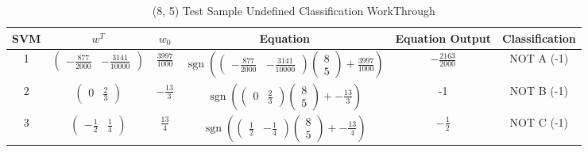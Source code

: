 \documentclass[12pt]{report}
\begin{document}
\begin{table}[H]
	\begin{adjustbox}{width=1.2\textwidth}
		\begin{tabular}{| c | c | c | c | c | c |}
			\hline
			SVM & $w^T$                                                  & $w_{0}$         & Equation & Equation Output & Classification \\ [0.5ex]
			\hline
			1   & $
				\begin{pmatrix}-\frac{877}{2000}&-\frac{3141}{10000}\end{pmatrix}
			$   & $
				\frac{3997}{1000}
			$   &
			$
				\mathop{sgn}(\begin{pmatrix}-\frac{877}{2000}&-\frac{3141}{10000}\end{pmatrix} \begin{pmatrix}8\\ 5\end{pmatrix} + \frac{3997}{1000})
			$   & $
				-\frac{2163}{2000}
			$   & NOT A (-1)                                                                                                             \\
			\hline
			2   & $\begin{pmatrix}0&\frac{2}{3}\end{pmatrix}$            & $-\frac{13}{3}$ & $
				\mathop{sgn}(\begin{pmatrix}0&\frac{2}{3}\end{pmatrix} \begin{pmatrix}8\\ 5\end{pmatrix} + -\frac{13}{3})
			$   & -1
			    & NOT B (-1)                                                                                                             \\
			\hline
			3   & $\begin{pmatrix}-\frac{1}{2}&\frac{1}{4}\end{pmatrix}$ & $\frac{13}{4}$  & $
				\mathop{sgn}(\begin{pmatrix}\frac{1}{2}& -\frac{1}{4}\end{pmatrix} \begin{pmatrix}8\\ 5\end{pmatrix} + -\frac{13}{4})
			$   & $-\frac{1}{2}$                                         & NOT C (-1)                                                    \\
			\hline
		\end{tabular}
	\end{adjustbox}
	\caption{(8, 5) Test Sample Undefined Classification WorkThrough}
	\label{table:undefinedworkthrough}
\end{table}
\end{document}
